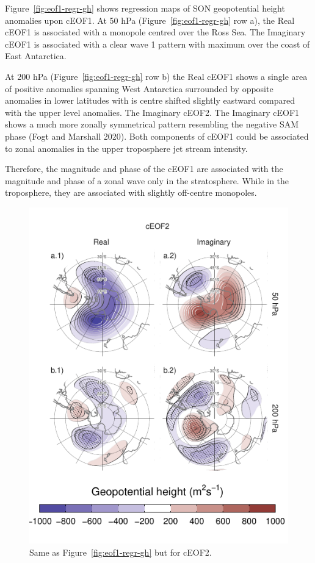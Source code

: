 \documentclass[smallextended]{svjour3}       %
\begin{document}
Figure~\ref{fig:eof1-regr-gh} shows regression maps of SON geopotential height anomalies upon cEOF1.
At 50 hPa (Figure~\ref{fig:eof1-regr-gh} row a), the Real cEOF1 is associated with a monopole centred over the Ross Sea.
The Imaginary cEOF1 is associated with a clear wave 1 pattern with maximum over the coast of East Antarctica.

At 200 hPa (Figure~\ref{fig:eof1-regr-gh} row b) the Real cEOF1 shows a single area of positive anomalies spanning West Antarctica surrounded by opposite anomalies in lower latitudes with is centre shifted slightly eastward compared with the upper level anomalies.
The Imaginary cEOF2.
The Imaginary cEOF1 shows a much more zonally symmetrical pattern resembling the negative SAM phase (Fogt and Marshall 2020).
Both components of cEOF1 could be associated to zonal anomalies in the upper troposphere jet stream intensity.

Therefore, the magnitude and phase of the cEOF1 are associated with the magnitude and phase of a zonal wave only in the stratosphere.
While in the troposphere, they are associated with slightly off-centre monopoles.



\begin{figure}
\centering
\includegraphics{../figures/eof2-regr-gh-1.pdf}
\caption{\label{fig:eof2-regr-gh}Same as Figure~\ref{fig:eof1-regr-gh} but for cEOF2.}
\end{figure}
\end{document}
